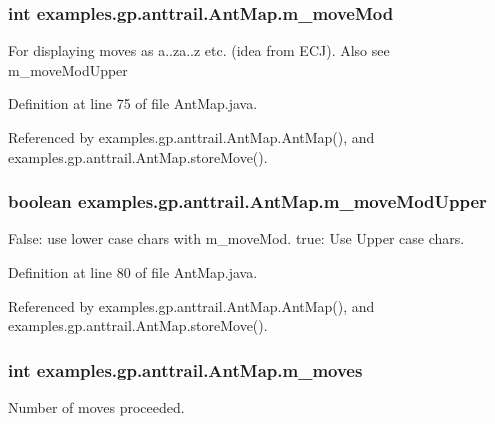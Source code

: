 \hypertarget{classexamples_1_1gp_1_1anttrail_1_1_ant_map_a5775cffaa10d0b03112296a1f9394d5d}{
\subsubsection[{m\-\_\-move\-Mod}]{\setlength{\rightskip}{0pt plus 5cm}int examples.\-gp.\-anttrail.\-Ant\-Map.\-m\-\_\-move\-Mod\hspace{0.3cm}{\ttfamily [private]}}}\label{classexamples_1_1gp_1_1anttrail_1_1_ant_map_a5775cffaa10d0b03112296a1f9394d5d}
For displaying moves as a..za..z etc. (idea from E\-C\-J). Also see m\-\_\-move\-Mod\-Upper 

Definition at line 75 of file Ant\-Map.\-java.



Referenced by examples.\-gp.\-anttrail.\-Ant\-Map.\-Ant\-Map(), and examples.\-gp.\-anttrail.\-Ant\-Map.\-store\-Move().

\hypertarget{classexamples_1_1gp_1_1anttrail_1_1_ant_map_ad6f8fd4fb0a5468172d43ea23f40f9c0}{
\subsubsection[{m\-\_\-move\-Mod\-Upper}]{\setlength{\rightskip}{0pt plus 5cm}boolean examples.\-gp.\-anttrail.\-Ant\-Map.\-m\-\_\-move\-Mod\-Upper\hspace{0.3cm}{\ttfamily [private]}}}\label{classexamples_1_1gp_1_1anttrail_1_1_ant_map_ad6f8fd4fb0a5468172d43ea23f40f9c0}
False\-: use lower case chars with m\-\_\-move\-Mod. true\-: Use Upper case chars. 

Definition at line 80 of file Ant\-Map.\-java.



Referenced by examples.\-gp.\-anttrail.\-Ant\-Map.\-Ant\-Map(), and examples.\-gp.\-anttrail.\-Ant\-Map.\-store\-Move().

\hypertarget{classexamples_1_1gp_1_1anttrail_1_1_ant_map_a718e60059c6e78690ffccd148264726b}{
\subsubsection[{m\-\_\-moves}]{\setlength{\rightskip}{0pt plus 5cm}int examples.\-gp.\-anttrail.\-Ant\-Map.\-m\-\_\-moves\hspace{0.3cm}{\ttfamily [private]}}}\label{classexamples_1_1gp_1_1anttrail_1_1_ant_map_a718e60059c6e78690ffccd148264726b}
Number of moves proceeded. 

